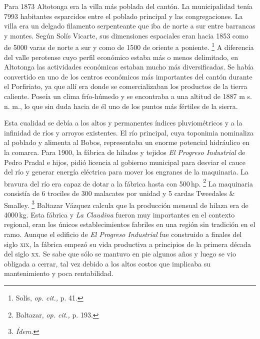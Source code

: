 \documentclass[14pt,twoside,final]{extbook} %
\let\oldfootnote\footnote
\renewcommand\footnote[1]{%
\oldfootnote{\hspace{1mm}#1}}
\begin{document}
Para 1873 Altotonga era la villa más poblada del cantón. La municipalidad tenía 7993 habitantes esparcidos entre el poblado principal y las congregaciones. La villa era un delgado filamento serpenteante que iba de norte a sur entre barrancas y montes. Según Solís Vicarte, sus dimensiones espaciales eran hacia 1853 como de 5000 varas de norte a sur y como de 1500 de oriente a poniente.\footnote{Solís, \emph{op. cit.,} p. 41.} A diferencia del valle perotense cuyo perfil económico estaba más o menos delimitado, en Altotonga las actividades económicas estaban mucho más diversificadas. Se había convertido en uno de los centros económicos más importantes del cantón durante el Porfiriato, ya que allí era donde se comercializaban los productos de la tierra caliente. Poseía un clima frío-húmedo y se encontraba a una altitud de 1887 m s. n. m., lo que sin duda hacia de él uno de los puntos más fértiles de la sierra.

Esta cualidad se debía a los altos y permanentes índices pluviométricos y a la infinidad de ríos y arroyos existentes. El río principal, cuya toponimia nominaliza al poblado y alimenta al Bobos, representaba un enorme potencial hidráulico en la comarca. Para 1900, la fábrica de hilados y tejidos \emph{El Progreso Industrial} de Pedro Pradal e hijos, pidió licencia al gobierno municipal para desviar el cauce del río y generar energía eléctrica para mover los engranes de la maquinaria. La bravura del río era capaz de dotar a la fábrica hasta con 500\,hp.\footnote{Baltazar, \emph{op. cit.,} p. 193.} La maquinaria consistía de 6 trociles de 300 malacates por unidad y 5 cardas Tweedales \& Smalley.\footnote{\em Ídem.} Baltazar Vázquez calcula que la producción mensual de hilaza era de 4000\,kg. Esta fábrica y \emph{La Claudina} fueron muy importantes en el contexto regional, eran los únicos establecimientos fabriles en una región sin tradición en el ramo. Aunque el edificio de \emph{El Progreso Industrial} fue construido a finales del siglo \textsc{xix}, la fábrica empezó su vida productiva a principios de la primera década del siglo \textsc{xx}. Se sabe que sólo se mantuvo en pie algunos años y luego se vio obligada a cerrar, tal vez debido a los altos costos que implicaba su mantenimiento y poca rentabilidad.
\end{document}

